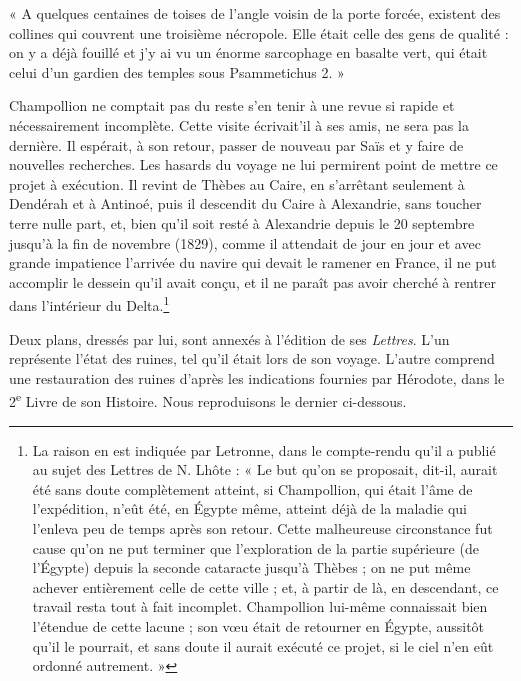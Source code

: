 \documentclass[letterpaper,twocolumn,openany,nodeprecatedcode]{dndbook}
\begin{document}
« A quelques centaines de toises de l'angle voisin de la porte forcée, existent des collines qui couvrent une troisième nécropole. Elle était celle des gens de qualité : on y a déjà fouillé et j'y ai vu un énorme sarcophage en basalte vert, qui était celui d'un gardien des temples sous Psammetichus 2. »

Champollion ne comptait pas du reste s'en tenir à une revue si rapide et nécessairement incomplète. Cette visite écrivait'il à ses amis, ne sera pas la dernière. Il espérait, à son retour, passer de nouveau par Saïs et y faire de nouvelles recherches. Les hasards du voyage ne lui permirent point de mettre ce projet à exécution. Il revint de Thèbes au Caire, en s'arrêtant seulement à Dendérah et à Antinoé, puis il descendit du Caire à Alexandrie, sans toucher terre nulle part, et, bien qu'il soit resté à Alexandrie depuis le 20 septembre jusqu'à la fin de novembre (1829), comme il attendait de jour en jour et avec grande impatience l'arrivée du navire qui devait le ramener en France, il ne put accomplir le dessein qu'il avait conçu, et il ne paraît pas avoir cherché à rentrer dans l'intérieur du Delta.\footnote{La raison en est indiquée par Letronne, dans le compte-rendu qu'il a publié au sujet des Lettres de N. Lhôte : « Le but qu'on se proposait, dit-il, aurait été sans doute complètement atteint, si Champollion, qui était l'âme de l'expédition, n'eût été, en Égypte même, atteint déjà de la maladie qui l'enleva peu de temps après son retour. Cette malheureuse circonstance fut cause qu'on ne put terminer que l'exploration de la partie supérieure (de l'Égypte) depuis la seconde cataracte jusqu'à Thèbes ; on ne put même achever entièrement celle de cette ville ; et, à partir de là, en descendant, ce travail resta tout à fait incomplet. Champollion lui-même connaissait bien l'étendue de cette lacune ; son vœu était de retourner en Égypte, aussitôt qu'il le pourrait, et sans doute il aurait exécuté ce projet, si le ciel n'en eût ordonné autrement. »}

Deux plans, dressés par lui, sont annexés à l'édition de ses \emph{Lettres}. L'un représente l'état des ruines, tel qu'il était lors de son voyage. L'autre comprend une restauration des ruines d'après les indications fournies par Hérodote, dans le 2\textsuperscript{e} Livre de son Histoire. Nous reproduisons le dernier ci-dessous.
\end{document}
